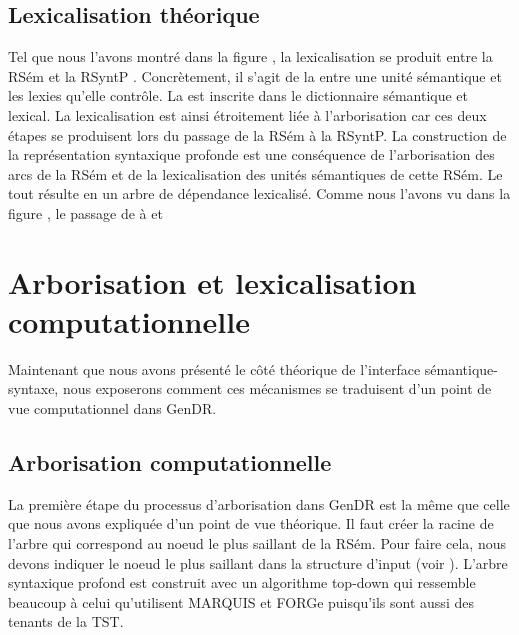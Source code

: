 \subsection{Lexicalisation théorique}
Tel que nous l'avons montré dans la figure , la lexicalisation se produit entre la RSém et la RSyntP \citep{PolguereStructurationmisejeu1990}. Concrètement, il s'agit de la  entre une unité sémantique et les lexies qu'elle contrôle. La  est inscrite dans le dictionnaire sémantique et lexical. La lexicalisation est ainsi étroitement liée à l'arborisation car ces deux étapes se produisent lors du passage de la RSém à la RSyntP. La construction de la représentation syntaxique profonde est une conséquence de l'arborisation des arcs de la RSém et de la lexicalisation des unités sémantiques de cette RSém. Le tout résulte en un arbre de dépendance lexicalisé. Comme nous l'avons vu dans la figure , le passage de  à  et  



\section{Arborisation et lexicalisation computationnelle}\label{secarbolex}

Maintenant que nous avons présenté le côté théorique de l'interface sémantique-syntaxe, nous exposerons comment ces mécanismes se traduisent d'un point de vue computationnel dans GenDR.

\subsection{Arborisation computationnelle}
La première étape du processus d'arborisation dans GenDR est la même que celle que nous avons expliquée d'un point de vue théorique. Il faut créer la racine de l'arbre qui correspond au noeud le plus saillant de la RSém. Pour faire cela, nous devons indiquer le noeud le plus saillant dans la structure d'input (voir ). L'arbre syntaxique profond est construit avec un algorithme top-down qui ressemble beaucoup à celui qu'utilisent MARQUIS et FORGe puisqu'ils sont aussi des tenants de la TST.

